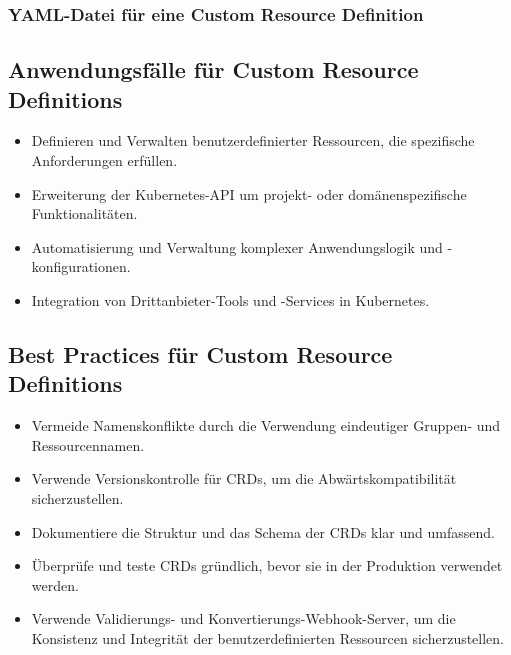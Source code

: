 \subsubsection{YAML-Datei für eine Custom Resource Definition}


\newpage
\subsection{Anwendungsfälle für Custom Resource Definitions}
\begin{itemize}
    \item Definieren und Verwalten benutzerdefinierter Ressourcen, die spezifische Anforderungen erfüllen.
    \item Erweiterung der Kubernetes-API um projekt- oder domänenspezifische Funktionalitäten.
    \item Automatisierung und Verwaltung komplexer Anwendungslogik und -konfigurationen.
    \item Integration von Drittanbieter-Tools und -Services in Kubernetes.
\end{itemize}

\subsection{Best Practices für Custom Resource Definitions}
\begin{itemize}
    \item Vermeide Namenskonflikte durch die Verwendung eindeutiger Gruppen- und Ressourcennamen.
    \item Verwende Versionskontrolle für CRDs, um die Abwärtskompatibilität sicherzustellen.
    \item Dokumentiere die Struktur und das Schema der CRDs klar und umfassend.
    \item Überprüfe und teste CRDs gründlich, bevor sie in der Produktion verwendet werden.
    \item Verwende Validierungs- und Konvertierungs-Webhook-Server, um die Konsistenz und Integrität der benutzerdefinierten Ressourcen sicherzustellen.
\end{itemize}

